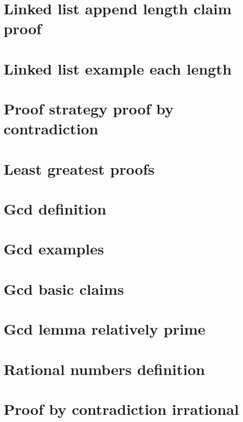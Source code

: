 \section*{Linked list append length claim proof}

\vfill
\section*{Linked list example each length}

\vfill
\section*{Proof strategy proof by contradiction}

\vfill
\section*{Least greatest proofs}

\vfill
\section*{Gcd definition}

\vfill
\section*{Gcd examples}

\vfill
\section*{Gcd basic claims}

\vfill
\section*{Gcd lemma relatively prime}

\vfill
\section*{Rational numbers definition}

\vfill
\section*{Proof by contradiction irrational}

\vfill
